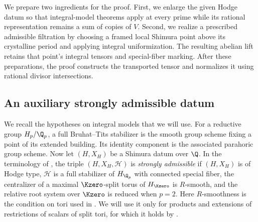 We prepare two ingredients for the proof. First, we enlarge the given
Hodge datum so that integral-model theorems apply at every prime while
its rational representation remains a sum of copies of \(V\).
Second, we realize a prescribed admissible filtration by choosing a
framed local Shimura point above its crystalline period and applying
integral uniformization.  The resulting abelian lift retains that
point's integral tensors and special-fiber marking.  After these
preparations, the proof constructs the transported tensor and normalizes
it using rational divisor intersections.

\subsection{An auxiliary strongly admissible datum}

We recall the hypotheses on integral models that we will use.
For a reductive group \(H_p/\Q_p\), a full Bruhat--Tits stabilizer
is the smooth group scheme fixing a point of its extended building.
Its identity component is the associated parahoric group scheme.
Now let \((H,X_H)\) be a Shimura datum over \(\Q\). In the terminology
of \cite[Definition~2.1.6]{KisinZhou2025}, the triple
\((H,X_H,\mathcal H)\) is \emph{strongly admissible} if \((H,X_H)\)
is of Hodge type, \(\mathcal H\) is a full stabilizer of \(H_{\Q_p}\)
with connected special fiber, the centralizer of a maximal
\(\Kzero\)-split torus of \(H_{\Kzero}\) is \(R\)-smooth, and the
relative root system over \(\Kzero\) is reduced when \(p=2\).  Here $R$-smoothness is the condition on tori used in
\cite[\S2.4]{KisinZhouEarlier}.  We will use it only for products and
extensions of restrictions of scalars of split tori, for which it
holds by \cite[Proposition~2.4.6]{KisinZhouEarlier}.

